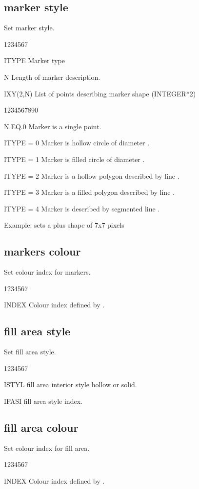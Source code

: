 \subsection{ marker style}
%
\Action
Set marker style.
\Pdesc
\begin{DLtt}{1234567}
\item[ITYPE] Marker type
\item[N] Length of marker description.
\item[IXY(2,N)] List of points describing marker shape (INTEGER*2)
\begin{DLtt}{1234567890}
\item[N.EQ.0] Marker is a single point.
\item[ITYPE = 0 ] Marker is hollow circle of diameter .
\item[ITYPE = 1 ] Marker is filled circle of diameter .
\item[ITYPE = 2 ] Marker is a hollow polygon described by line .
\item[ITYPE = 3 ] Marker is a filled polygon described by line .
\item[ITYPE = 4 ] Marker is described by segmented line .
\end{DLtt}
\end{DLtt}
Example:  sets a plus shape of
7x7 pixels
\subsection{ markers colour}
%
\Action
Set colour index for markers.
\Pdesc
\begin{DLtt}{1234567}
\item[INDEX] Colour index defined by .
\end{DLtt}
\subsection{ fill area style}
%
\Action
Set fill area style.
\Pdesc
\begin{DLtt}{1234567}
\item[ISTYL] fill area interior style hollow or solid.
\item[IFASI] fill area style index.
\end{DLtt}
\subsection{ fill area colour}
%
\Action
Set colour index for fill area.
\Pdesc
\begin{DLtt}{1234567}
\item[INDEX] Colour index defined by .
\end{DLtt}



